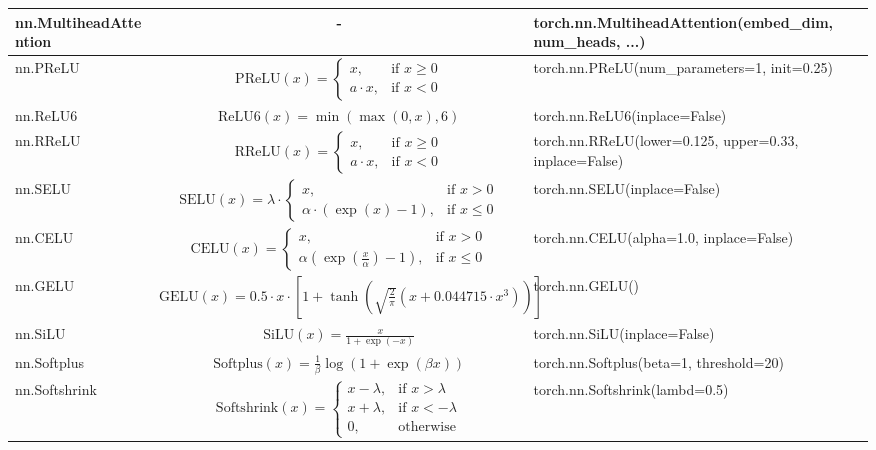 \begin{table}[h]
{\begin{tabular}{|l|c|l|}
        nn.MultiheadAttention & - & torch.nn.MultiheadAttention(embed\_dim, num\_heads, ...) \\ \hline
        nn.PReLU & $\text{PReLU}(x) = \begin{cases} x, & \text{if } x \geq 0 \\ a \cdot x, & \text{if } x < 0 \end{cases}$ & torch.nn.PReLU(num\_parameters=1, init=0.25) \\ \hline
        nn.ReLU6 & $\text{ReLU6}(x) = \min(\max(0, x), 6)$ & torch.nn.ReLU6(inplace=False) \\ \hline
        nn.RReLU & $\text{RReLU}(x) = \begin{cases} x, & \text{if } x \geq 0 \\ a \cdot x, & \text{if } x < 0 \end{cases}$ & torch.nn.RReLU(lower=0.125, upper=0.33, inplace=False) \\ \hline
        nn.SELU & $\text{SELU}(x) = \lambda \cdot \begin{cases} x, & \text{if } x > 0 \\ \alpha \cdot (\exp(x) - 1), & \text{if } x \leq 0 \end{cases}$ & torch.nn.SELU(inplace=False) \\ \hline
        nn.CELU & $\text{CELU}(x) = \begin{cases} x, & \text{if } x > 0 \\ \alpha (\exp(\frac{x}{\alpha}) - 1), & \text{if } x \leq 0 \end{cases}$ & torch.nn.CELU(alpha=1.0, inplace=False) \\ \hline
        nn.GELU & $\text{GELU}(x) = 0.5 \cdot x \cdot \left[1 + \tanh(\sqrt{\frac{2}{\pi}} (x + 0.044715 \cdot x^3))\right]$ & torch.nn.GELU() \\ \hline
        nn.SiLU & $\text{SiLU}(x) = \frac{x}{1 + \exp(-x)}$ & torch.nn.SiLU(inplace=False) \\ \hline
        nn.Softplus & $\text{Softplus}(x) = \frac{1}{\beta} \log(1 + \exp(\beta x))$ & torch.nn.Softplus(beta=1, threshold=20) \\ \hline
        nn.Softshrink & $\text{Softshrink}(x) = \begin{cases} x - \lambda, & \text{if } x > \lambda \\ x + \lambda, & \text{if } x < -\lambda \\ 0, & \text{otherwise} \end{cases}$ & torch.nn.Softshrink(lambd=0.5) \\ \hline

\end{tabular}}
\end{table}
